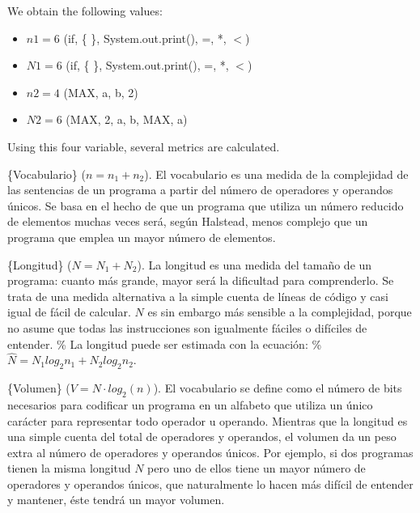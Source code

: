 \documentclass[]{book}
\providecommand{\tightlist}{%
  \setlength{\itemsep}{0pt}\setlength{\parskip}{0pt}}
\theoremstyle{definition}
\theoremstyle{definition}
\theoremstyle{remark}
\begin{document}
We obtain the following values:

\begin{itemize}
\tightlist
\item
  \(n1 = 6\) (if, \{ \}, System.out.print(), =, *, \(<\))
\item
  \(N1 = 6\) (if, \{ \}, System.out.print(), =, *, \(<\))
\item
  \(n2 = 4\) (MAX, a, b, 2)
\item
  \(N2 = 6\) (MAX, 2, a, b, MAX, a)
\end{itemize}

Using this four variable, several metrics are calculated.

\{Vocabulario\} (\(n = n_{1} + n_{2}\)). El vocabulario es una medida de
la complejidad de las sentencias de un programa a partir del número de
operadores y operandos únicos. Se basa en el hecho de que un programa
que utiliza un número reducido de elementos muchas veces será, según
Halstead, menos complejo que un programa que emplea un mayor número de
elementos.

\{Longitud\} (\(N = N_{1} + N_{2}\)). La longitud es una medida del
tamaño de un programa: cuanto más grande, mayor será la dificultad para
comprenderlo. Se trata de una medida alternativa a la simple cuenta de
líneas de código y casi igual de fácil de calcular. \(N\) es sin embargo
más sensible a la complejidad, porque no asume que todas las
instrucciones son igualmente fáciles o difíciles de entender. \% La
longitud puede ser estimada con la ecuación: \%
\(\hat{N} = N_{1} log_2 n_1 + N_{2} log_2 n_2\).

\{Volumen\} (\(V = N \cdot log_{2}(n)\)). El vocabulario se define como
el número de bits necesarios para codificar un programa en un alfabeto
que utiliza un único carácter para representar todo operador u operando.
Mientras que la longitud es una simple cuenta del total de operadores y
operandos, el volumen da un peso extra al número de operadores y
operandos únicos. Por ejemplo, si dos programas tienen la misma longitud
\(N\) pero uno de ellos tiene un mayor número de operadores y operandos
únicos, que naturalmente lo hacen más difícil de entender y mantener,
éste tendrá un mayor volumen.
\end{document}
